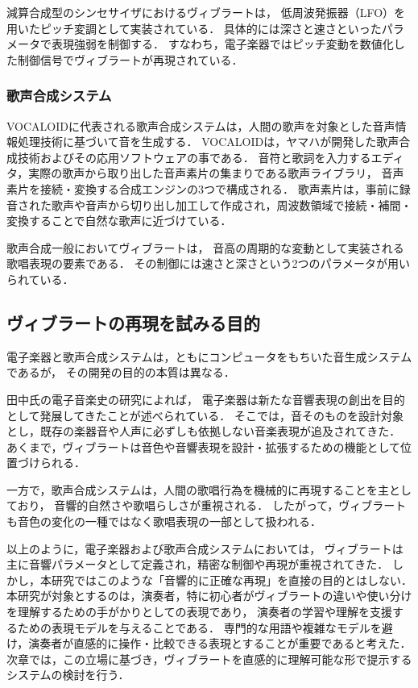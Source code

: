 減算合成型のシンセサイザにおけるヴィブラート\cite{Domae10}は，
低周波発振器（LFO）を用いたピッチ変調として実装されている．
具体的には深さと速さといったパラメータで表現強弱を制御する．
すなわち，電子楽器ではピッチ変動を数値化した制御信号でヴィブラートが再現されている．


\subsubsection{歌声合成システム}

VOCALOID\cite{Vocaloid}に代表される歌声合成システムは，人間の歌声を対象とした音声情報処理技術に基づいて音を生成する．
VOCALOIDは，ヤマハが開発した歌声合成技術およびその応用ソフトウェアの事である．
音符と歌詞を入力するエディタ，実際の歌声から取り出した音声素片の集まりである歌声ライブラリ，
音声素片を接続・変換する合成エンジンの3つで構成される．
歌声素片は，事前に録音された歌声や音声から切り出し加工して作成され，周波数領域で接続・補間・変換することで自然な歌声に近づけている．

歌声合成一般\cite{Tanaka20}においてヴィブラートは，
音高の周期的な変動として実装される歌唱表現の要素である．
その制御には速さと深さという2つのパラメータが用いられている．


\subsection{ヴィブラートの再現を試みる目的}

電子楽器と歌声合成システムは，ともにコンピュータをもちいた音生成システムであるが，
その開発の目的の本質は異なる．

田中氏の電子音楽史の研究\cite{Tanaka16}によれば，
電子楽器は新たな音響表現の創出を目的として発展してきたことが述べられている．
そこでは，音そのものを設計対象とし，既存の楽器音や人声に必ずしも依拠しない音楽表現が追及されてきた．
あくまで，ヴィブラートは音色や音響表現を設計・拡張するための機能として位置づけられる．

一方で，歌声合成システムは，人間の歌唱行為を機械的に再現することを主としており，
音響的自然さや歌唱らしさが重視される\cite{Nakano07}．
したがって，ヴィブラートも音色の変化の一種ではなく歌唱表現の一部として扱われる．


以上のように，電子楽器および歌声合成システムにおいては，
ヴィブラートは主に音響パラメータとして定義され，精密な制御や再現が重視されてきた．
しかし，本研究ではこのような「音響的に正確な再現」を直接の目的とはしない．
本研究が対象とするのは，演奏者，特に初心者がヴィブラートの違いや使い分けを理解するための手がかりとしての表現であり，
演奏者の学習や理解を支援するための表現モデルを与えることである．
専門的な用語や複雑なモデルを避け，演奏者が直感的に操作・比較できる表現とすることが重要であると考えた．
次章では，この立場に基づき，ヴィブラートを直感的に理解可能な形で提示するシステムの検討を行う．


